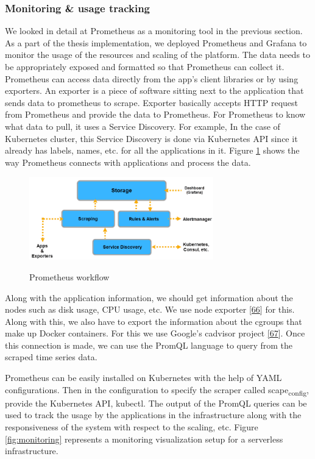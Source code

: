 \documentclass[12pt,titlepage]{article}
\begin{document}
\subsubsection{Monitoring \& usage tracking}
\label{sec:org1072a69}
We looked in detail at Prometheus as a monitoring tool in the previous section.
As a part of the thesis implementation, we deployed Prometheus and Grafana to
monitor the usage of the resources and scaling of the platform. The data needs
to be appropriately exposed and formatted so that Prometheus can collect it.
Prometheus can access data directly from the app’s client libraries or by using
exporters. An exporter is a piece of software sitting next to the application
that sends data to prometheus to scrape. Exporter basically accepts HTTP request
from Prometheus and provide the data to Prometheus. For Prometheus to know what
data to pull, it uses a Service Discovery. For example, In the case of
Kubernetes cluster, this Service Discovery is done via Kubernetes API since it
already has labels, names, etc. for all the applications in it. Figure
\ref{fig:service_disc} shows the way Prometheus connects with applications and
process the data.

\begin{figure}[!h]
    \caption{Prometheus workflow}
    \centering
    \includegraphics[width=80mm]{./thesis_images/service_disc.png}
    \label{fig:service_disc}
\end{figure}

Along with the application information, we should get information about the
nodes such as disk usage, CPU usage, etc. We use node exporter \hyperref[ref:66]{[66}] for this. Along
with this, we also have to export the information about the cgroups that make up
Docker containers. For this we use Google's cadvisor project \hyperref[ref:67]{[67}]. Once this
connection is made, we can use the PromQL language to query from the scraped
time series data.

Prometheus can be easily installed on Kubernetes with the help of YAML
configurations. Then in the configuration to specify the scraper called
scape\textsubscript{config}, provide the Kubernetes API, kubectl. The output of the PromQL
queries can be used to track the usage by the applications in the infrastructure
along with the responsiveness of the system with respect to the scaling, etc.
Figure \ref{fig:monitoring} represents a monitoring visualization setup for a
serverless infrastructure.
\end{document}
